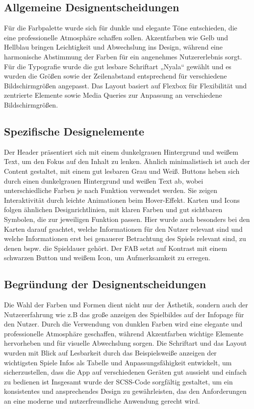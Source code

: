 \subsection{Allgemeine Designentscheidungen}
Für die Farbpalette wurde sich für dunkle und elegante Töne entschieden, die eine professionelle Atmosphäre schaffen sollen.
Akzentfarben wie Gelb und Hellblau bringen Leichtigkeit und Abwechslung ins Design, während eine harmonische Abstimmung der Farben für ein angenehmes Nutzererlebnis sorgt.
\newline
Für die Typografie wurde die gut lesbare Schriftart „Nyala“ gewählt und es wurden die Größen sowie der Zeilenabstand entsprechend für verschiedene Bildschirmgrößen angepasst.
\newline
Das Layout basiert auf Flexbox für Flexibilität und zentrierte Elemente sowie Media Queries zur Anpassung an verschiedene Bildschirmgrößen.
\subsection{Spezifische Designelemente}
Der Header präsentiert sich mit einem dunkelgrauen Hintergrund und weißem Text, um den Fokus auf den Inhalt zu lenken. Ähnlich minimalistisch ist auch der Content gestaltet, mit einem gut lesbaren Grau und Weiß.
\newline
Buttons heben sich durch einen dunkelgrauen Hintergrund und weißen Text ab, wobei unterschiedliche Farben je nach Funktion verwendet werden. Sie zeigen Interaktivität durch leichte Animationen beim Hover-Effekt.
\newline
Karten und Icons folgen ähnlichen Designrichtlinien, mit klaren Farben und gut sichtbaren Symbolen, die zur jeweiligen Funktion passen. Hier wurde auch besonders bei den Karten darauf geachtet, welche Informationen für den Nutzer relevant sind und welche Informationen erst bei genauerer Betrachtung des Spiels relevant sind, zu denen bspw. die Spieldauer gehört.
\newline
Der \ac{FAB} setzt auf Kontrast mit einem schwarzen Button und weißem Icon, um Aufmerksamkeit zu erregen.
\subsection{Begründung der Designentscheidungen}
Die Wahl der Farben und Formen dient nicht nur der Ästhetik, sondern auch der Nutzererfahrung wie z.B das große anzeigen des Spielbildes auf der Infopage für den Nutzer. Durch die Verwendung von dunklen Farben wird eine elegante und professionelle Atmosphäre geschaffen, während Akzentfarben wichtige Elemente hervorheben und für visuelle Abwechslung sorgen.
Die Schriftart und das Layout wurden mit Blick auf Lesbarkeit durch das Beispielsweiße anzeigen der wichtigsten Spiele Infos als Tabelle und Anpassungsfähigkeit entwickelt, um sicherzustellen, dass die App auf verschiedenen Geräten gut aussieht und einfach zu bedienen ist
Insgesamt wurde der SCSS-Code sorgfältig gestaltet, um ein konsistentes und ansprechendes Design zu gewährleisten, das den Anforderungen an eine moderne und nutzerfreundliche Anwendung gerecht wird.
